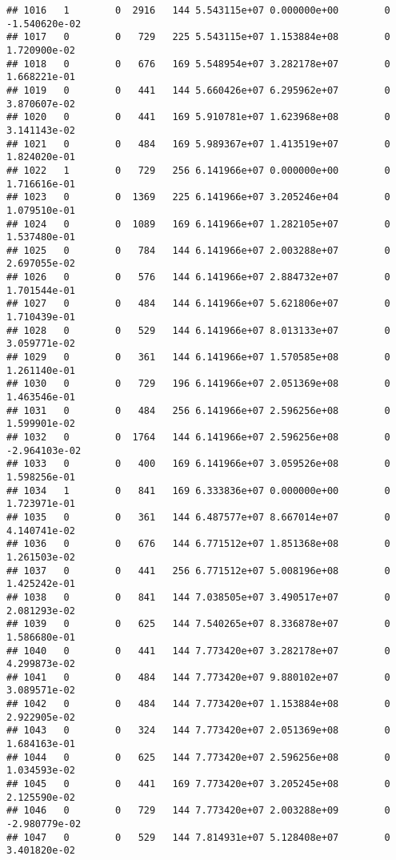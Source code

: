 \documentclass[
]{article}
\begin{document}
\begin{enumerate}
\begin{verbatim}
## 1016   1        0  2916   144 5.543115e+07 0.000000e+00        0 -1.540620e-02
## 1017   0        0   729   225 5.543115e+07 1.153884e+08        0  1.720900e-02
## 1018   0        0   676   169 5.548954e+07 3.282178e+07        0  1.668221e-01
## 1019   0        0   441   144 5.660426e+07 6.295962e+07        0  3.870607e-02
## 1020   0        0   441   169 5.910781e+07 1.623968e+08        0  3.141143e-02
## 1021   0        0   484   169 5.989367e+07 1.413519e+07        0  1.824020e-01
## 1022   1        0   729   256 6.141966e+07 0.000000e+00        0  1.716616e-01
## 1023   0        0  1369   225 6.141966e+07 3.205246e+04        0  1.079510e-01
## 1024   0        0  1089   169 6.141966e+07 1.282105e+07        0  1.537480e-01
## 1025   0        0   784   144 6.141966e+07 2.003288e+07        0  2.697055e-02
## 1026   0        0   576   144 6.141966e+07 2.884732e+07        0  1.701544e-01
## 1027   0        0   484   144 6.141966e+07 5.621806e+07        0  1.710439e-01
## 1028   0        0   529   144 6.141966e+07 8.013133e+07        0  3.059771e-02
## 1029   0        0   361   144 6.141966e+07 1.570585e+08        0  1.261140e-01
## 1030   0        0   729   196 6.141966e+07 2.051369e+08        0  1.463546e-01
## 1031   0        0   484   256 6.141966e+07 2.596256e+08        0  1.599901e-02
## 1032   0        0  1764   144 6.141966e+07 2.596256e+08        0 -2.964103e-02
## 1033   0        0   400   169 6.141966e+07 3.059526e+08        0  1.598256e-01
## 1034   1        0   841   169 6.333836e+07 0.000000e+00        0  1.723971e-01
## 1035   0        0   361   144 6.487577e+07 8.667014e+07        0  4.140741e-02
## 1036   0        0   676   144 6.771512e+07 1.851368e+08        0  1.261503e-02
## 1037   0        0   441   256 6.771512e+07 5.008196e+08        0  1.425242e-01
## 1038   0        0   841   144 7.038505e+07 3.490517e+07        0  2.081293e-02
## 1039   0        0   625   144 7.540265e+07 8.336878e+07        0  1.586680e-01
## 1040   0        0   441   144 7.773420e+07 3.282178e+07        0  4.299873e-02
## 1041   0        0   484   144 7.773420e+07 9.880102e+07        0  3.089571e-02
## 1042   0        0   484   144 7.773420e+07 1.153884e+08        0  2.922905e-02
## 1043   0        0   324   144 7.773420e+07 2.051369e+08        0  1.684163e-01
## 1044   0        0   625   144 7.773420e+07 2.596256e+08        0  1.034593e-02
## 1045   0        0   441   169 7.773420e+07 3.205245e+08        0  2.125590e-02
## 1046   0        0   729   144 7.773420e+07 2.003288e+09        0 -2.980779e-02
## 1047   0        0   529   144 7.814931e+07 5.128408e+07        0  3.401820e-02

\end{verbatim}
\end{enumerate}
\end{document}
